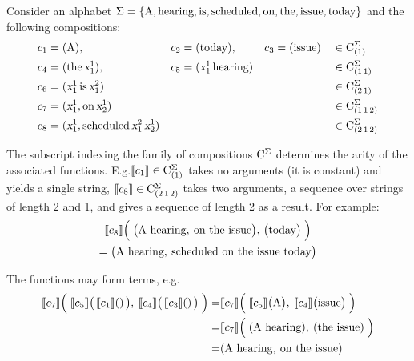 \documentclass[../../document.tex]{subfiles}
\begin{document}
    \begin{example}\label{ex:lcfrs:comp}
        Consider an alphabet \(\Sigma=\{\text{A}, \text{hearing}, \text{is}, \text{scheduled}, \text{on}, \text{the}, \text{issue}, \text{today}\}\) and the following compositions:
        \begin{align*}
            c_1 &= (\text{A}), & c_2 &= (\text{today}), & c_3 &= (\text{issue}) && \in \mathrm{C}^\Sigma_{(1)} \\
            c_4 &= (\text{the} \, \textsl{x}_1^1), & c_5 &= (\textsl{x}_1^1 \, \text{hearing}) & & && \in \mathrm{C}^\Sigma_{(1\,1)} \\
            c_6 &= (\textsl{x}_1^1 \, \text{is} \, \textsl{x}_1^2) && && && \in \mathrm{C}^\Sigma_{(2\,1)} \\
            c_7 &= (\textsl{x}_1^1, \text{on} \, \textsl{x}_2^1) && && && \in \mathrm{C}^\Sigma_{(1\,1\,2)}   \\
            c_8 &= (\textsl{x}_1^1, \text{scheduled} \, \textsl{x}_1^2 \, \textsl{x}_2^1) && && && \in \mathrm{C}^\Sigma_{(2\,1\,2)}
        \end{align*}

        The subscript indexing the family of compositions \(\mathrm{C}^\Sigma\) determines the arity of the associated functions.
        E.g.\@ \(\llbracket c_1\rrbracket \in \mathrm{C}^\Sigma_{(1)}\) takes no arguments (it is constant) and yields a single string,
        \(\llbracket c_8\rrbracket \in \mathrm{C}^\Sigma_{(2\,1\,2)}\) takes two arguments, a sequence over strings of length 2 and 1, and gives a sequence of length 2 as a result.
        For example:
        \begin{multline*}
            \llbracket c_8\rrbracket\Big( \; \big( \text{A hearing}, \: \text{on the issue} \big), \, \big( \text{today} \big) \; \Big)
            \\= \big( \text{A hearing}, \: \text{scheduled on the issue today} \big)
        \end{multline*}

        The functions may form terms, e.g.
        \begin{align*}
            \llbracket c_7\rrbracket\Big( \; \llbracket c_5\rrbracket\big(\,\llbracket c_1\rrbracket()\,\big), \: \llbracket c_4\rrbracket\big(\,\llbracket c_3\rrbracket()\,\big) \; \Big)
            =& \llbracket c_7\rrbracket\Big( \; \llbracket c_5\rrbracket\big(\text{A}\big), \: \llbracket c_4\rrbracket\big(\text{issue}\big) \; \Big) \\
            =& \llbracket c_7\rrbracket\Big( \; (\text{A hearing}), \: (\text{the issue}) \; \Big) \\
            =& (\text{A hearing}, \: \text{on the issue})
        \end{align*}
    \end{example}
\end{document}
